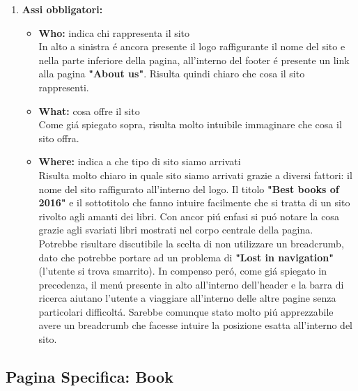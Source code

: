 \documentclass[12pt]{article}
\begin{document}
\begin{enumerate}
\item {\large \textbf{Assi obbligatori:}}
	\begin{itemize}
		\item \textbf{Who:} indica chi rappresenta il sito\\
		In alto a sinistra \'e ancora presente il logo raffigurante il nome del sito e nella parte inferiore della pagina, all'interno del footer \'e presente un link alla pagina \textbf{"About us"}. Risulta quindi chiaro che cosa il sito rappresenti.
		\item \textbf{What:} cosa offre il sito\\
		Come gi\'a spiegato sopra, risulta molto intuibile immaginare che cosa il sito offra.
		\item \textbf{Where:} indica a che tipo di sito siamo arrivati\\
		Risulta molto chiaro in quale sito siamo arrivati grazie a diversi fattori: il nome del sito raffigurato all'interno del logo. Il titolo \textbf{"Best books of 2016"} e il sottotitolo che fanno intuire facilmente che si tratta di un sito rivolto agli amanti dei libri. Con ancor pi\'u enfasi si pu\'o notare la cosa grazie agli svariati libri mostrati nel corpo centrale della pagina.\\
		Potrebbe risultare discutibile la scelta di non utilizzare un breadcrumb, dato che potrebbe portare ad un problema di \textbf{"Lost in navigation"} (l'utente si trova smarrito). In compenso per\'o, come gi\'a spiegato in precedenza, il men\'u presente in alto all'interno dell'header e la barra di ricerca aiutano l'utente a viaggiare all'interno delle altre pagine senza particolari difficolt\'a. Sarebbe comunque stato molto pi\'u apprezzabile avere un breadcrumb che facesse intuire la posizione esatta all'interno del sito.
	\end{itemize}	

\end{enumerate}


\subsection{Pagina Specifica: Book}
\end{document}
